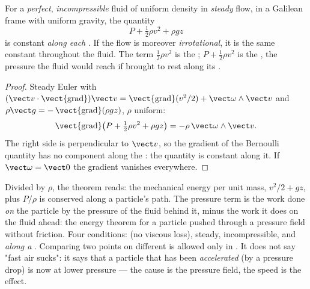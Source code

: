 \begin{theorem}[Bernoulli]\label{thm:b2:euler-bernoulli:bernoulli}
For a \emph{perfect}, \emph{incompressible} fluid of uniform density in
\emph{steady} flow, in a Galilean frame with uniform gravity, the quantity
\[
P + \tfrac12\rho v^2 + \rho gz
\]
is constant \emph{along each }. If the flow is moreover
\emph{irrotational}, it is the same constant throughout the fluid. The
term $\tfrac12\rho v^2$ is the \emph{}; $P + \tfrac12\rho v^2$
is the \emph{}, the pressure the fluid would reach
if brought to rest along its .
\end{theorem}

\begin{proof}
Steady Euler with $(\vect v\cdot\operatorname{\vect{grad}})\vect v =
\operatorname{\vect{grad}}(v^2/2) + \vect\omega\wedge\vect v$ and $\rho\vect g =
-\operatorname{\vect{grad}}(\rho gz)$, $\rho$ uniform:
\[
\operatorname{\vect{grad}}\bigl(P + \tfrac12\rho v^2 + \rho gz\bigr) = -\rho\,
\vect\omega\wedge\vect v .
\]
The right side is perpendicular to $\vect v$, so the gradient of the
Bernoulli quantity has no component along the : the quantity
is constant along it. If $\vect\omega = \vect 0$ the gradient vanishes
everywhere.
\end{proof}

\begin{remark}\label{rem:b2:euler-bernoulli:meaning}
Divided by $\rho$, the theorem reads: the mechanical energy per unit
mass, $v^2/2 + gz$, plus $P/\rho$ is conserved along a particle's path.
The pressure term is the work done \emph{on} the particle by the
pressure of the fluid behind it, minus the work it does on the fluid
ahead: the energy theorem for a particle pushed through a pressure
field without friction. Four conditions:  (no viscous
loss), steady, incompressible, and \emph{along a }. Comparing
two points on different  is allowed only in . It does not say "fast air sucks": it says that a particle that
has been \emph{accelerated} (by a pressure drop) is now at lower
pressure --- the cause is the pressure field, the speed is the effect.
\end{remark}

